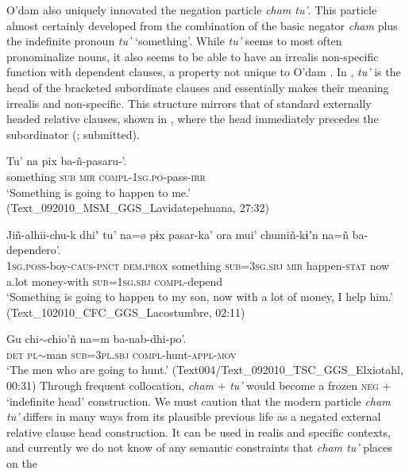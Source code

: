 \documentclass[output=paper,draft,draftmode,colorlinks,citecolor=brown]{langscibook}
\begin{document}
O'dam also uniquely innovated the negation particle \emph{cham tu'}. This particle almost certainly developed from the combination of the basic negator \emph{cham} plus the indefinite pronoun \emph{tu'} `something'. While \emph{tu'} seems to most often pronominalize nouns, it also seems to be able to have an irrealis non-specific function with dependent clauses, a property not unique to O'dam \citep{Haspelmath1997}. In , \emph{tu'} is the head of the bracketed subordinate clauses and essentially makes their meaning irrealis and non-specific. This structure mirrors that of standard externally headed relative clauses, shown in , where the head immediately precedes the subordinator  (\citeauthor{garciasubm}; submitted).
\ea
\label{ex:odam-sometheve}
\begin{xlist}
\item\gll Tu’ na pix ba-ñ-pasaru-’.\\
something \textsc{sub} \textsc{mir} \textsc{compl-1sg.po}-pass-\textsc{irr}\\
\glt ‘Something is going to happen to me.’ (Text\_092010\_MSM\_GGS\_Lavidatepehuana, 27:32)
\item\gll Jiñ-alhii-chu-k dhiʼ tu’ {{\ob}}{na=\o} {pɨx} pasar-ka'{{\cb}} ora mui' chumiñ-kɨʼn na=ñ ba-dependero'.\\
\textsc{1sg.poss}-boy-\textsc{caus-pnct} \textsc{dem.prox} something \textsc{sub=3sg.sbj} \textsc{mir} happen-\textsc{stat} now a.lot money-with \textsc{sub=1sg.sbj} \textsc{compl}-depend\\
\glt ‘Something is going to happen to my son, now with a lot of money, I help him.’
(Text\_102010\_CFC\_GGS\_Lacostumbre, 02:11)
\end{xlist}
\z
\ea
\label{ex:odam-exheadrel}
\gll Gu chi$\sim$chio’ñ 	{{\ob}}na=m ba-nab-dhi-po’{{\cb}}.\\
	\textsc{det} \textsc{pl}$\sim$man	\textsc{sub=3pl.sbj} \textsc{compl}-hunt-\textsc{appl-mov}\\
\glt ‘The men who are going to hunt.’ (Text004/Text\_092010\_TSC\_GGS\_Elxiotahl, 00:31)
\z
Through frequent collocation, \emph{cham} + \emph{tu'} would become a
frozen \textsc{neg} + `indefinite head' construction.  We must caution that
the modern particle \emph{cham tu'} differs in many ways from its plausible
previous life as a negated external relative clause head construction. It
can be used in realis and specific contexts,  and currently we
do not know of any semantic constraints that \emph{cham tu'} places on the
\end{document}
